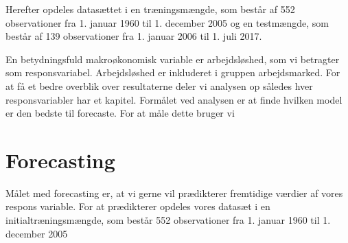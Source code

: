 %
Herefter opdeles datasættet i en træningsmængde, som består af 552 observationer fra 1. januar 1960 til 1. december 2005 og en testmængde, som består af 139 observationer fra 1. januar 2006 til 1. juli 2017. 

En betydningsfuld makroøkonomisk variable er arbejdsløshed, som vi betragter som responsvariabel.  
Arbejdsløshed er inkluderet i gruppen arbejdsmarked.
For at få et bedre overblik over resultaterne deler vi analysen op således hver responsvariabler har et kapitel. 
Formålet ved analysen er at finde hvilken model er den bedste til forecaste. For at måle dette bruger vi 


\section{Forecasting}
Målet med forecasting er, at vi gerne vil prædikterer fremtidige værdier af vores respons variable. 
For at prædikterer opdeles vores datasæt i en initialtræningsmængde, som består 552 observationer fra 1. januar 1960 til 1. december 2005 